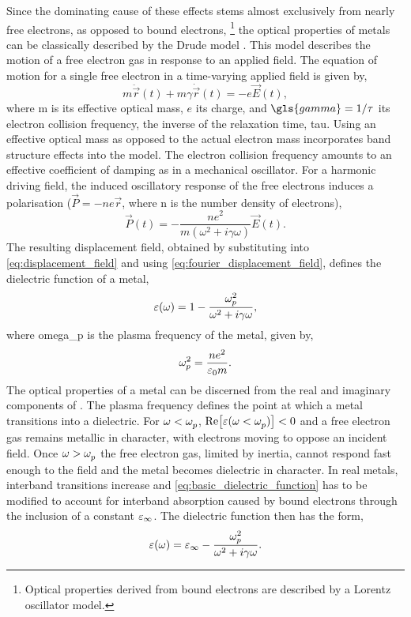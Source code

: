 \documentclass{article}
\begin{document}
Since the dominating cause of these effects stems almost exclusively from nearly free electrons, as opposed to bound electrons,%
\footnote{Optical properties derived from bound electrons are described by a Lorentz oscillator model.}
the optical properties of metals can be classically described by the Drude model \cite{drude1900}. This model describes the motion of a free electron gas in response to an applied field. The equation of motion for a single free electron in a time-varying applied field is given by,
\begin{equation}
	m\ddot{\vec{r}}(t) + m\gamma \dot{\vec{r}}(t) = -e\vec{E}(t),
\end{equation}
where \gls{m} is its effective optical mass, $e$ its charge, and $\gls{gamma} = 1/\tau$ its electron collision frequency, the inverse of the relaxation time, \gls{tau}. Using an effective optical mass as opposed to the actual electron mass incorporates band structure effects into the model. The electron collision frequency amounts to an effective coefficient of damping as in a mechanical oscillator. For a harmonic driving field, the induced oscillatory response of the free electrons induces a polarisation ($\vec{P} = -ne\vec{r}$, where \gls{n} is the number density of electrons),
\begin{equation}
	\vec{P}(t) = -\frac{ne^2}{m(\omega^2 + i\gamma\omega)}\vec{E}(t).
	\label{eq:P_solution}
\end{equation}
The resulting displacement field, obtained by substituting  into \eqref{eq:displacement_field} and using \eqref{eq:fourier_displacement_field}, defines the dielectric function of a metal,
\begin{equation}
	\eps(\omega) = 1 - \frac{\omegap[2]}{\omega^2 + i\gamma\omega},
	\label{eq:basic_dielectric_function}
\end{equation}
where \gls{omega_p} is the plasma frequency of the metal, given by,
\begin{equation}
	\omegap[2] = \frac{ne^2}{\varepsilon_0 m}.
	\label{eq:plasma_frequency}
\end{equation}
The optical properties of a metal can be discerned from the real and imaginary components of \dielectric. The plasma frequency defines the point at which a metal transitions into a dielectric. For $\omega<\omega_{p}^{}$, $\mathrm{Re}\!\left[{\varepsilon(\omega<\omega_{p}^{})}\right] < 0$ and a free electron gas remains metallic in character, with electrons moving to oppose an incident field. Once $\omega > \omega_{p}^{}$ the free electron gas, limited by inertia, cannot respond fast enough to the field and the metal becomes dielectric in character. In real metals, interband transitions increase \imag{\dielectric} and \eqref{eq:basic_dielectric_function} has to be modified to account for interband absorption caused by bound electrons through the inclusion of a constant $\varepsilon_\infty$. The dielectric function then has the form,
\begin{equation}
	\dielectric = \eps_\infty - \frac{\omegap[2]}{\omega^2 + i\gamma\omega}.
	\label{eq:dielectric_function}
\end{equation}
\end{document}
